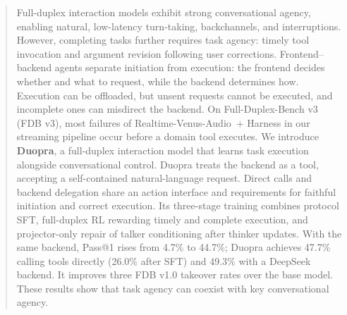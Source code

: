 \begin{abstract}
Full-duplex interaction models exhibit strong conversational agency, enabling natural, low-latency turn-taking, backchannels, and interruptions. However, completing tasks further requires task agency: timely tool invocation and argument revision following user corrections. Frontend--backend agents separate initiation from execution: the frontend decides whether and what to request, while the backend determines how. Execution can be offloaded, but unsent requests cannot be executed, and incomplete ones can misdirect the backend. On Full-Duplex-Bench v3 (FDB v3), most failures of Realtime-Venus-Audio~+ Harness in our streaming pipeline occur before a domain tool executes.
We introduce \textbf{Duopra}, a full-duplex interaction model that learns task execution alongside conversational control. Duopra treats the backend as a tool, accepting a self-contained natural-language request. Direct calls and backend delegation share an action interface and requirements for faithful initiation and correct execution. Its three-stage training combines protocol SFT, full-duplex RL rewarding timely and complete execution, and projector-only repair of talker conditioning after thinker updates. With the same backend, Pass@1 rises from 4.7\% to 44.7\%; Duopra achieves 47.7\% calling tools directly (26.0\% after SFT) and 49.3\% with a DeepSeek backend. It improves three FDB v1.0 takeover rates over the base model. These results show that task agency can coexist with key conversational agency.
\end{abstract}